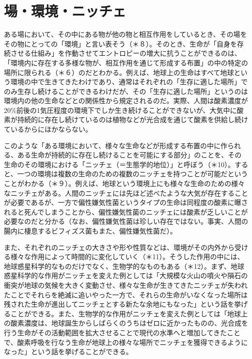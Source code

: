 \documentclass[8pt, a5paper]{ltjsarticle}
\begin{document}
\section{場・環境・ニッチェ}\label{ux5834ux74b0ux5883ux30cbux30c3ux30c1ux30a7}

ある場において、その中にある物が他の物と相互作用をしているとき、その場をその物にとっての「環境」と言い表そう（＊８）。そのとき、生命が「自身を存続させる仕組み」を作動させてエントロピーの増大に抗うことができるのは、「環境内に存在する多様な物が、相互作用を通じて形成する布置」の中の特定の場所に限られる（＊６）のだとわかる。例えば、地球上の生命はすべて地球という環境の中で生きてきたわけであり、通常はそれぞれの「生存に適した場所」でのみ生存し続けることができるわけだが、その「生存に適した場所」というのは環境内の他の生命などとの関係性から規定されるのだ。実際、人間は酸素濃度が20\%前後の1気圧程度の環境下でしか生き続けることができないが、大気中に酸素が持続的に存在し続けているのは植物などが光合成を通じて酸素を供給し続けているからにほかならない。

このような「ある環境において、様々な生命などが形成する布置の中に作られる、ある生命が持続的に存在し続けることを可能にする部分」のことを、その生命のその環境における「ニッチェ（＝生態学的地位）」と呼ぼう（＊10）。すると、一つの環境は複数の生命のための複数のニッチェを持つことが可能だということがわかる（＊９）。例えば、地球という環境上にも様々な生命のための様々なニッチェがある。人間のニッチェには先ほど述べたような大気が存在することが必要であるが、一方で偏性嫌気性菌というタイプの生命は同程度の酸素に曝されると死んでしまうことから、偏性嫌気性菌のニッチェには酸素が乏しいことが必要なのだと分かる（なお、偏性嫌気性菌は珍しい存在ではない。事実、人間の腸内に棲息するビフィズス菌もまた、偏性嫌気性菌だ）。

また、それぞれのニッチェの大きさや形や性質などは、環境がその内外から受ける様々な作用によって時間的に変化していく（＊11）。そうした作用の中には、地球惑星科学的なものだけでなく、生物学的なものもある（＊12）。まず、地球惑星科学的な作用がニッチェを変えた例としては「大規模な火山の噴火や隕石の衝突が地球の気候を大きく変動させ、様々な生命が生きてきたニッチェが失われたことでそれらを絶滅に追いやった一方で、それらの生命がいなくなった場所は残された生命が進出してニッチェとする新たな余地にもなった」という話を挙げることができる。また、生物学的な作用がニッチェを変えた例としては「地球上の酸素濃度は、地球誕生からしばらくのうちはゼロに近かったものの、光合成を行う生命がその活動範囲を拡大させることで現代の水準へと増加してきたことで、酸素呼吸を行なう生命が地球上の様々な場所でニッチェを獲得できるようになった」という話を挙げることができる。
\end{document}

